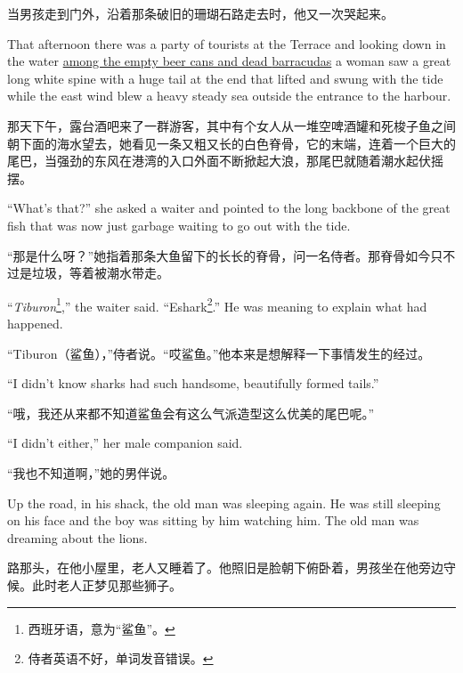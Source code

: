 \begin{paracol}{2}
\switchcolumn

当男孩走到门外，沿着那条破旧的珊瑚石路走去时，他又一次哭起来。

\switchcolumn*

That afternoon there was a party of tourists at the Terrace and looking down
in the water \uline{among the empty beer cans and dead \glspl{barracuda}} a
woman saw a great long white \gls{spine} with a huge tail at the end that
lifted and swung with the \gls{tide} while the east wind blew a heavy steady
sea outside the \gls{entrance} to the harbour.

\switchcolumn

那天下午，露台酒吧来了一群游客，其中有个女人从一堆空啤酒罐和死梭子鱼之间朝下面的海水望去，她看见一条又粗又长的白色脊骨，它的末端，连着一个巨大的尾巴，当强劲的东风在港湾的入口外面不断掀起大浪，那尾巴就随着潮水起伏摇摆。

\switchcolumn*

``What's that?'' she asked a waiter and pointed to the long backbone of the
great fish that was now just \gls{garbage} waiting to go out with the tide.

\switchcolumn

“那是什么呀？”她指着那条大鱼留下的长长的脊骨，问一名侍者。那脊骨如今只不过是垃圾，等着被潮水带走。

\switchcolumn*

``\emph{Tiburon}\footnote{西班牙语，意为“鲨鱼”。},'' the waiter said.
``Eshark\footnote{侍者英语不好，单词发音错误。}.'' He was meaning to explain
what had happened.

\switchcolumn

“Tiburon（鲨鱼），”侍者说。“哎鲨鱼。”他本来是想解释一下事情发生的经过。

\switchcolumn*

``I didn't know sharks had such handsome, \gls{beautifully} formed tails.''

\switchcolumn

“哦，我还从来都不知道鲨鱼会有这么气派造型这么优美的尾巴呢。”

\switchcolumn*

``I didn't either,'' her male \gls{companion} said.

\switchcolumn

“我也不知道啊，”她的男伴说。

\switchcolumn*

Up the road, in his shack, the old man was sleeping again. He was still
sleeping on his face and the boy was sitting by him watching him. The old
man was dreaming about the lions.


\switchcolumn

路那头，在他小屋里，老人又睡着了。他照旧是脸朝下俯卧着，男孩坐在他旁边守候。此时老人正梦见那些狮子。


\switchcolumn*

\end{paracol}